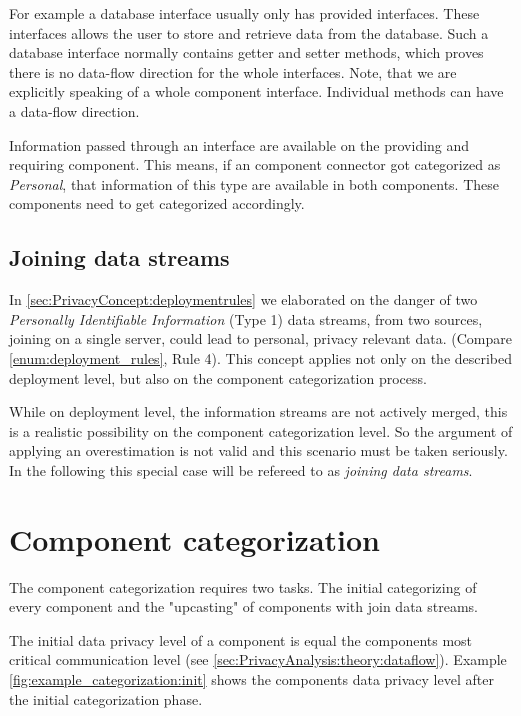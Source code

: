 For example a database interface usually only has provided interfaces. These interfaces allows the user to store and retrieve data from the database. Such a database interface normally contains getter and setter methods, which proves there is no data-flow direction for the whole interfaces. Note, that we are explicitly speaking of a whole component interface. Individual methods can have a data-flow direction.

Information passed through an interface are available on the providing and requiring component. This means, if an component connector got categorized as \textit{Personal}, that information of this type are available in both components. These components need to get categorized accordingly.

\subsection{Joining data streams}
\label{sec:PrivacyAnalysis:theory:jds}
In \autoref{sec:PrivacyConcept:deploymentrules} we elaborated on the danger of two \textit{Personally Identifiable Information} (Type 1) data streams, from two sources, joining on a single server, could lead to personal, privacy relevant data. (Compare \autoref{enum:deployment_rules}, Rule 4). This concept applies not only on the described deployment level, but also on the component categorization process.

While on deployment level, the information streams are not actively merged, this is a realistic possibility on the component categorization level. So the argument of applying an overestimation is not valid and this scenario must be taken seriously. In the following this special case will be refereed to as \textit{joining data streams}.


\section{Component categorization}
\label{sec:PrivacyAnalysis:categorization}

The component categorization requires two tasks. The initial categorizing of every component and the "upcasting" of components with join data streams.

The initial data privacy level of a component is equal the components most critical communication level (see \autoref{sec:PrivacyAnalysis:theory:dataflow}). Example \autoref{fig:example_categorization:init} shows the components data privacy level after the initial categorization phase.

